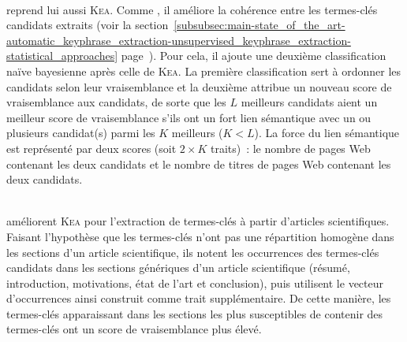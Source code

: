         ~\\ reprend lui aussi \textsc{Kea}.
        Comme , il améliore la
        cohérence entre les termes-clés candidats extraits (voir la
        section~\ref{subsubsec:main-state_of_the_art-automatic_keyphrase_extraction-unsupervised_keyphrase_extraction-statistical_approaches}
        page~\pageref{subsubsec:main-state_of_the_art-automatic_keyphrase_extraction-unsupervised_keyphrase_extraction-statistical_approaches:ilp}).
        Pour cela,
        il ajoute une deuxième classification naïve bayesienne après celle de
        \textsc{Kea}. La première classification sert à ordonner les candidats
        selon leur vraisemblance et la deuxième attribue un nouveau score de
        vraisemblance aux candidats, de sorte que les $L$ meilleurs candidats
        aient un meilleur score de vraisemblance s'ils ont un fort lien
        sémantique avec un ou plusieurs candidat(s) parmi les $K$ meilleurs ($K
        < L$). La force du lien sémantique est représenté par deux scores (soit
        $2 \times K$ traits)~: le nombre de pages Web contenant les deux
        candidats et le nombre de titres de pages Web contenant les deux
        candidats.

        ~\\ améliorent \textsc{Kea} pour
        l'extraction de termes-clés à partir d'articles scientifiques. Faisant
        l'hypothèse que les termes-clés n'ont pas une répartition homogène dans
        les sections d'un article scientifique, ils notent les occurrences des
        termes-clés candidats dans les sections génériques d'un article
        scientifique (résumé, introduction, motivations, état de l'art et
        conclusion), puis utilisent le vecteur d'occurrences ainsi construit
        comme trait supplémentaire. De cette manière, les termes-clés
        apparaissant dans les sections les plus susceptibles de contenir des
        termes-clés ont un score de vraisemblance plus élevé.
        
